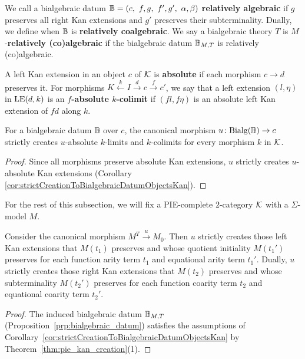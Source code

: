 \begin{definition}
     We call a bialgebraic datum $\B = (c,\ f,g,\ f',g',\ \alpha,\beta)$ \textbf{relatively algebraic} if $g$ preserves all right Kan extensions and $g'$ preserves their subterminality. Dually, we define when $\mathbb{B}$ is \textbf{relatively coalgebraic}. We say a bialgebraic theory $T$ is $M$-\textbf{relatively (co)algebraic} if the bialgebraic datum $\mathbb{B}_{M,T}$ is relatively (co)algebraic.
\end{definition}

A left Kan extension in an object $c$ of $\mathcal{K}$ is \textbf{absolute} if each morphism $c\to d$ preserves it. For morphisms $K\xleftarrow{k}I\xrightarrow{d}c\xrightarrow{f}c'$, we say that a left extension $(l,\eta)$ in $\mathrm{LE}(d,k)$ is an \textbf{$f$-absolute $k$-colimit} if $(fl,f\eta)$ is an absolute left Kan extension of $fd$ along $k$.
\begin{corollary}\label{cor:LiftingAbsoluteExtensions}
    For a bialgebraic datum $\mathbb{B}$ over $c$, the canonical morphism $u\colon \mathrm{Bialg}(\mathbb{B})\to c$ strictly creates $u$-absolute $k$-limits and $k$-colimits for every morphism $k$ in $\mathcal{K}$.
\end{corollary}
\begin{proof}
    Since all morphisms preserve absolute Kan extensions, $u$ strictly creates $u$-absolute Kan extensions (Corollary \ref{cor:strictCreationToBialgebraicDatumObjectsKan}).
\end{proof}

\noindent
For the rest of this subsection, we will fix a PIE-complete $2$-category $\mathcal{K}$ with a $\Sigma$-model $M$.

\begin{corollary}\label{cor:LimitsLiftedToBialgebras}
   Consider the canonical morphism $M^T\xrightarrow{u} M_0$. Then $u$ strictly creates those left Kan extensions that $M(t_1)$ preserves and whose quotient initiality $M(t_1')$ preserves for each function arity term $t_1$ and equational arity term $t_1'$. Dually, $u$ strictly creates those right Kan extensions that $M(t_2)$ preserves and whose subterminality $M(t_2')$ preserves for each function coarity term $t_2$ and equational coarity term $t_2'$.
\end{corollary}
\begin{proof}
   The induced bialgebraic datum $\mathbb{B}_{M,T}$ (Proposition~\ref{prp:bialgebraic_datum}) satisfies the assumptions of Corollary~\ref{cor:strictCreationToBialgebraicDatumObjectsKan} by Theorem~\ref{thm:pie_kan_creation}(1).
\end{proof}

